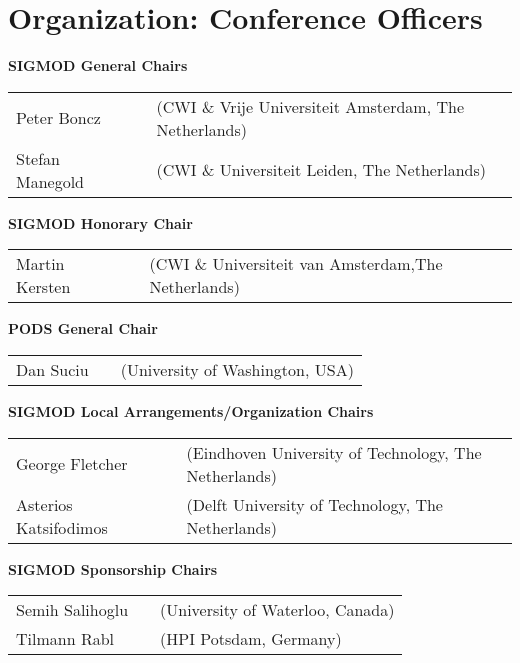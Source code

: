
\clearpage
\ifodd\value{page}\hbox{}\newpage\fi
\section{Organization: Conference Officers}

{
\setlength{\tabcolsep}{0pt}

\textbf{SIGMOD General Chairs}

\begin{tabular}{lp{.5em}l}
Peter Boncz	&& \textsf{\footnotesize(CWI \& Vrije Universiteit Amsterdam, The Netherlands)}	\\
Stefan Manegold	&& \textsf{\footnotesize(CWI \& Universiteit Leiden, The Netherlands)}	\\
\end{tabular}

\vfill
\textbf{SIGMOD Honorary Chair}

\begin{tabular}{lp{.5em}l}
Martin Kersten	&& \textsf{\footnotesize(CWI \& Universiteit van Amsterdam,The Netherlands)}
\end{tabular}

\vfill
\textbf{PODS General Chair}

\begin{tabular}{lp{.5em}l}
Dan Suciu	&& \textsf{\footnotesize(University of Washington, USA)}
\end{tabular}

\vfill
\textbf{SIGMOD Local Arrangements/Organization Chairs}

\begin{tabular}{lp{.5em}l}
George Fletcher	&& \textsf{\footnotesize(Eindhoven University of Technology, The Netherlands)}	\\
Asterios Katsifodimos	&& \textsf{\footnotesize(Delft University of Technology, The Netherlands)}
\end{tabular}

\vfill
\textbf{SIGMOD Sponsorship Chairs}

\begin{tabular}{lp{.5em}l}
Semih Salihoglu	&& \textsf{\footnotesize(University of Waterloo, Canada)}	\\
Tilmann Rabl	&& \textsf{\footnotesize(HPI Potsdam, Germany)}
\end{tabular}

}
